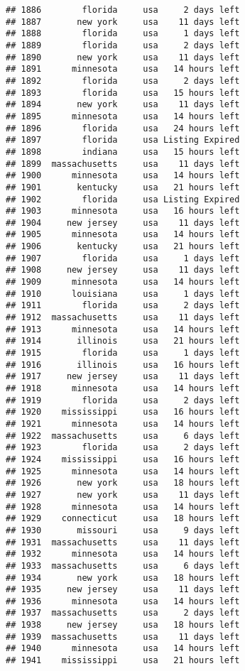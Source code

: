 \documentclass[
]{article}
\begin{document}
\begin{verbatim}
## 1886        florida     usa     2 days left
## 1887       new york     usa    11 days left
## 1888        florida     usa     1 days left
## 1889        florida     usa     2 days left
## 1890       new york     usa    11 days left
## 1891      minnesota     usa   14 hours left
## 1892        florida     usa     2 days left
## 1893        florida     usa   15 hours left
## 1894       new york     usa    11 days left
## 1895      minnesota     usa   14 hours left
## 1896        florida     usa   24 hours left
## 1897        florida     usa Listing Expired
## 1898        indiana     usa   15 hours left
## 1899  massachusetts     usa    11 days left
## 1900      minnesota     usa   14 hours left
## 1901       kentucky     usa   21 hours left
## 1902        florida     usa Listing Expired
## 1903      minnesota     usa   16 hours left
## 1904     new jersey     usa    11 days left
## 1905      minnesota     usa   14 hours left
## 1906       kentucky     usa   21 hours left
## 1907        florida     usa     1 days left
## 1908     new jersey     usa    11 days left
## 1909      minnesota     usa   14 hours left
## 1910      louisiana     usa     1 days left
## 1911        florida     usa     2 days left
## 1912  massachusetts     usa    11 days left
## 1913      minnesota     usa   14 hours left
## 1914       illinois     usa   21 hours left
## 1915        florida     usa     1 days left
## 1916       illinois     usa   16 hours left
## 1917     new jersey     usa    11 days left
## 1918      minnesota     usa   14 hours left
## 1919        florida     usa     2 days left
## 1920    mississippi     usa   16 hours left
## 1921      minnesota     usa   14 hours left
## 1922  massachusetts     usa     6 days left
## 1923        florida     usa     2 days left
## 1924    mississippi     usa   16 hours left
## 1925      minnesota     usa   14 hours left
## 1926       new york     usa   18 hours left
## 1927       new york     usa    11 days left
## 1928      minnesota     usa   14 hours left
## 1929    connecticut     usa   18 hours left
## 1930       missouri     usa     9 days left
## 1931  massachusetts     usa    11 days left
## 1932      minnesota     usa   14 hours left
## 1933  massachusetts     usa     6 days left
## 1934       new york     usa   18 hours left
## 1935     new jersey     usa    11 days left
## 1936      minnesota     usa   14 hours left
## 1937  massachusetts     usa     2 days left
## 1938     new jersey     usa   18 hours left
## 1939  massachusetts     usa    11 days left
## 1940      minnesota     usa   14 hours left
## 1941    mississippi     usa   21 hours left

\end{verbatim}
\end{document}
